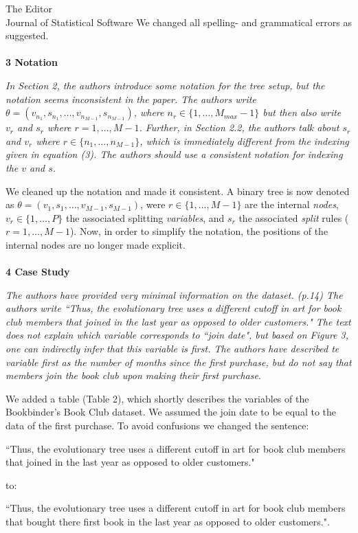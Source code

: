 \documentclass[DIN, pagenumber=false, parskip=half,%
               fromalign=left, fromphone=true,%
               fromemail=true, fromurl=false, %
               fromlogo=true, fromrule=false, fromrule=afteraddress]{scrlttr2}
\begin{document}
\begin{letter}{The Editor \\ Journal of Statistical Software}
We changed all spelling- and grammatical errors as suggested.
\\  \\
\textbf{3 Notation}

\textit{In Section 2, the authors introduce some notation for the tree setup, but the notation seems inconsistent in the paper. The authors write $\theta=(v_{n_1}, s_{n_1},\dots,v_{n_{M-1}},s_{n_{M-1}})$, where $n_r \in \{1,\dots, M_{max}-1\}$ but then also write $v_r$ and $s_r$ where $r=1,\dots,M-1$. Further, in Section 2.2, the authors talk about $s_r$ and $v_r$ where $r \in \{n_1, \dots, n_{M-1} \}$, which is immediately different from the indexing given
in equation (3). The authors should use a consistent notation for indexing the $v$ and $s$.}

We cleaned up the notation and made it consistent. A binary tree is now denoted as $\theta=(v_1, s_1, \dots, v_{M-1}, s_{M-1})$, were $r \in \{1,...,M-1\}$ are the internal \emph{nodes}, $v_r \in \{1, \dots ,P\}$ the associated splitting \emph{variables}, and $s_r$ the associated \emph{split} rules ($r = 1, \dots, M-1$). Now, in order to simplify the notation, the positions of the internal nodes are no longer made explicit. 
\\  \\
\textbf{4 Case Study}

\textit{The authors have provided very minimal information on the dataset. (p.14) The authors write
``Thus, the evolutionary tree uses a different cutoff in art for book club members that joined in the last year as opposed to older customers." The text does not explain which variable corresponds to ``join date", but based on Figure 3, one can indirectly infer that this variable is first. The authors have described te variable first as the number of months since the first purchase, but do not say that members join the book club upon making their first purchase.}

We added a table (Table 2), which shortly describes the variables of the Bookbinder's Book Club dataset. We assumed the join date to be equal to the data of the first purchase. To avoid confusions we changed the sentence: 

``Thus, the evolutionary tree uses a different cutoff in art for book club members that joined in the last year as opposed to older customers." 

to: 

``Thus, the evolutionary tree uses a different cutoff in art for book club members that bought there first book in the last year as opposed to older customers.".
\\ \\


\end{letter}
\end{document}
